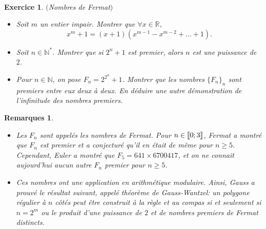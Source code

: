 \documentclass[11pt,a4paper]{article}
\newtheorem{ex}{Exercice}
\newtheorem*{rem2}{Remarques}
\begin{document}
\

\begin{ex}$($Nombres de Fermat$)$
\begin{itemize}
\item[$1.$] Soit $m$ un entier impair. Montrer que $\forall x \in \mathbb{R}$, 
$$ x^m+1=(x+1)(x^{m-1}-x^{m-2}+ \ldots +1)  .$$
\item[$2.$] Soit $n \in \mathbb{N}^*$. Montrer que si $2^n+1$ est premier, alors $n$ est une puissance de $2$.%
\item[$3.$] Pour $n \in \mathbb{N}$, on pose $F_n=2^{2^{n}}+1$. Montrer que les nombres $\{ F_n \}_n$ sont premiers entre eux deux à deux. En déduire une autre  démonstration de l'infinitude des nombres premiers. 
\end{itemize}
\end{ex}

\begin{rem2}\
\begin{itemize}
\item[•]Les $F_n$ sont appelés les nombres de Fermat. Pour $n \in \llbracket 0;3 \rrbracket $, Fermat a montré que $F_n$ est premier et a conjecturé qu'il en était de même pour $n \geqslant 5$. Cependant, Euler a montré que $F_5=641 \times 6700417$, et on ne connait aujourd'hui aucun autre $F_n$ premier pour $n \geqslant 5$.
\item[•]Ces nombres ont une application en arithmétique modulaire. Ainsi, Gauss a prouvé le résultat suivant, appelé théorème de Gauss-Wantzel: un polygone régulier à $n$ côtés peut être construit à la règle et au compas si et seulement si $n=2^m$ ou le produit d'une puissance de $2$ et de nombres premiers de Fermat distincts. 
\end{itemize} 
\end{rem2}
\end{document}
